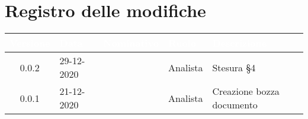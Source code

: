 \section*{Registro delle modifiche}
\setcounter{table}{-1}
{
\renewcommand{\arraystretch}{1.5}
\centering
\begin{longtable}{c C{2.6cm} C{3cm} C{2.6cm} C{5cm}}
\textcolor{white}{\textbf{Versione}}&
\textcolor{white}{\textbf{Data}}&
\textcolor{white}{\textbf{Nominativo}}&
\textcolor{white}{\textbf{Ruolo}}&
\textcolor{white}{\textbf{Descrizione}}\\	
\endhead

0.0.2 & 29-12-2020 & \RA{} & Analista & Stesura \S 4 \\
0.0.1 & 21-12-2020 & \ZM{} & Analista & Creazione bozza documento \\	
\end{longtable}
}
